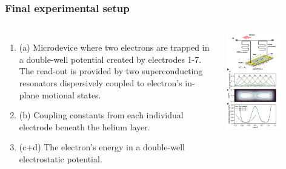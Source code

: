 \documentclass{beamer}
\begin{document}
\frame
    {
      \frametitle{Final experimental setup}
	
      \begin{footnotesize}
     \begin{columns}
       \column{5.0cm}
\begin{enumerate}
\item (a) Microdevice where two electrons are trapped in a double-well potential created by electrodes 1-7. The read-out is provided by two superconducting resonators dispersively coupled to  electron's in-plane motional states.

\item (b) Coupling constants from each individual electrode beneath the helium layer.

\item (c+d) The electron's energy in a  double-well electrostatic potential. 
\end{enumerate}

\column{6cm}
      \begin{center}
	\includegraphics[width=0.65\textwidth]{qcfigures/figure1.png}
      \end{center}
\end{columns}
      \end{footnotesize}
    }
\end{document}
